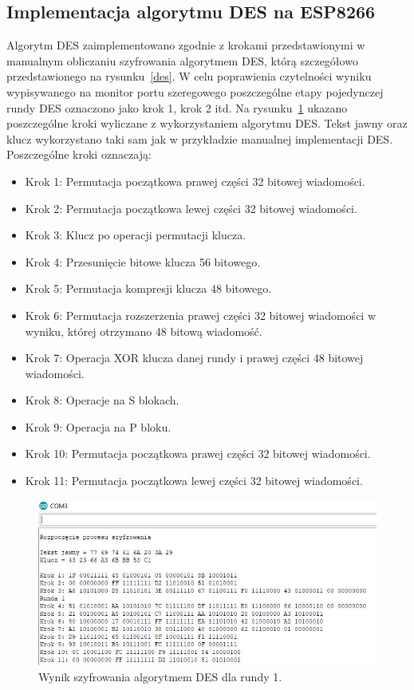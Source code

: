 \documentclass[12p]{article}
\begin{document}
\subsection{Implementacja algorytmu DES na ESP8266}

\quad Algorytm DES zaimplementowano zgodnie z krokami przedstawionymi w manualnym obliczaniu szyfrowania algorytmem DES, którą szczegółowo przedstawionego na rysunku~\ref{des}. W celu poprawienia czytelności wyniku wypisywanego na monitor portu szeregowego poszczególne etapy pojedynczej rundy DES oznaczono jako krok 1, krok 2 itd. Na rysunku~\ref{runda_1} ukazano poszczególne kroki wyliczane z wykorzystaniem algorytmu DES. Tekst jawny oraz klucz wykorzystano taki sam jak w przykładzie manualnej implementacji DES. Poszczególne kroki oznaczają:
\begin{itemize}
\item Krok 1: Permutacja początkowa prawej części 32 bitowej wiadomości.
\item Krok 2: Permutacja początkowa lewej części 32 bitowej wiadomości.
\item Krok 3: Klucz po operacji permutacji klucza.
\item Krok 4: Przesunięcie bitowe klucza 56 bitowego.
\item Krok 5: Permutacja kompresji klucza 48 bitowego.
\item Krok 6: Permutacja rozszerzenia prawej części 32 bitowej wiadomości w wyniku, której otrzymano 48 bitową wiadomość.
\item Krok 7: Operacja XOR klucza danej rundy i prawej części 48 bitowej wiadomości.
\item Krok 8: Operacje na S blokach.
\item Krok 9: Operacja na P bloku.
\item Krok 10: Permutacja początkowa prawej części 32 bitowej wiadomości.
\item Krok 11: Permutacja początkowa lewej części 32 bitowej wiadomości.
\end{itemize}

\begin{figure}[H]
\centering
\includegraphics[width=12cm]{runda_1.jpg}
\caption{Wynik szyfrowania algorytmem DES dla rundy 1.}\label{runda_1}
\end{figure}
\end{document}
